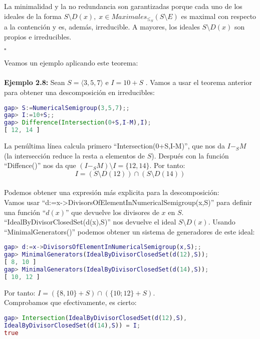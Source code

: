 \documentclass[11pt,spanish]{book}
\newcommand{\qed}{\begin{flushright} $\square$ \end{flushright}}
\begin{document}
La minimalidad y la no redundancia son garantizadas porque cada uno de los ideales de la forma $S\setminus D(x),\; x\in Maximales_{\leq_{S}}(S\setminus E)$ es maximal con respecto a la contención y es, además, irreducible. A mayores, los ideales $S\setminus D(x)$ son propios e irreducibles. 
\qed

Veamos un ejemplo aplicando este teorema:\\
\\ \textbf{Ejemplo 2.8:}
Sean $S= \langle 3, 5, 7\rangle $ e $I = 10 + S$ . Vamos a usar el teorema anterior para obtener una descomposición en irreducibles: 
\begin{lstlisting}[language=gap]
gap> S:=NumericalSemigroup(3,5,7);;
gap> I:=10+S;;
gap> Difference(Intersection(0+S,I-M),I);
[ 12, 14 ]
\end{lstlisting}

La penúltima línea calcula primero ``Intersection(0+S,I-M)'', que nos da $I-_{S} M$ (la intersección reduce la resta a elementos de $S$). Después con la función ``Diffence()'' nos da que $(I-_{S} M)\setminus I = \{12,14\}$. Por tanto: $$I=(S\setminus D(12))\cap (S\setminus D(14))$$\\

Podemos obtener una expresión más explicita para la descomposición:\\

Vamos usar ``d:=x->DivisorsOfElementInNumericalSemigroup(x,S)'' para definir una función ``$d(x)$'' que devuelve los divisores de $x$ en $S$.\\

``IdealByDivisorClosedSet(d(x),S)'' nos devuelve el ideal $S\setminus D(x)$. Usando ``MinimalGenerators()'' podemos obtener un sistema de generadores de este ideal:
\begin{lstlisting}[language=gap]
gap> d:=x->DivisorsOfElementInNumericalSemigroup(x,S);;
gap> MinimalGenerators(IdealByDivisorClosedSet(d(12),S));
[ 8, 10 ]
gap> MinimalGenerators(IdealByDivisorClosedSet(d(14),S));
[ 10, 12 ]
\end{lstlisting}
Por tanto: $I = (\{8, 10\} + S ) \cap (\{10; 12\} + S ).$ \\
Comprobamos que efectivamente, es cierto:
\begin{lstlisting}[language=gap]
gap> Intersection(IdealByDivisorClosedSet(d(12),S),
IdealByDivisorClosedSet(d(14),S)) = I;
true
\end{lstlisting}
\end{document}
